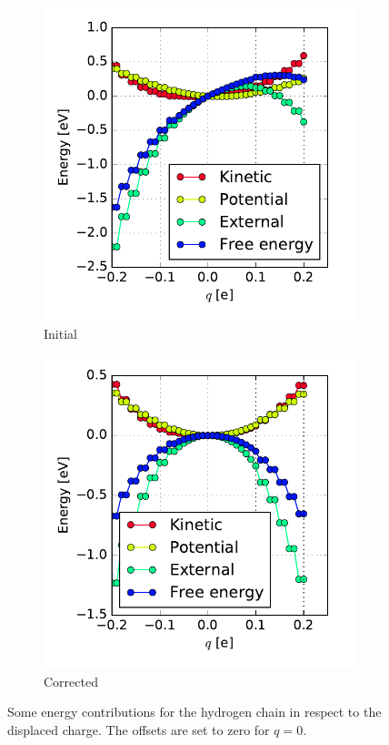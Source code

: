 \begin{figure}
	\centering
	\begin{subfigure}{0.45\textwidth}
		\centering
		\includegraphics[width = \textwidth]{Images/Hydrogen/charging/energy_contributions_asymmetric}
		\caption{Initial}
		\label{image_contributions_initial}
	\end{subfigure}\hspace*{1cm}
	\begin{subfigure}{0.45\textwidth}
		\centering
		\includegraphics[width = \textwidth]{Images/Hydrogen/charging/energy_contributions_symmetric}
		\caption{Corrected}
		\label{image_contributions_corrected}
	\end{subfigure}
	\caption{Some energy contributions for the hydrogen chain in respect to the displaced charge. The offsets are set to zero for $q=0$.}
\end{figure}
